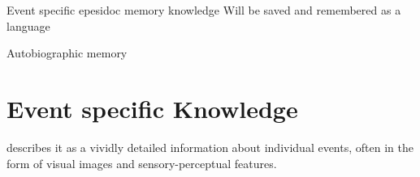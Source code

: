 \begin{frame}{Event specific epesidoc memory knowledge}
    Will be saved and remembered as a language
    
    Autobiographic memory
    
    
    \section{Event specific Knowledge}
        \cite{pillemer-2001-momentous-events-and-the-life-story} describes it as a vividly detailed information about individual events, often in the form of visual images and sensory-perceptual features.

\end{frame}